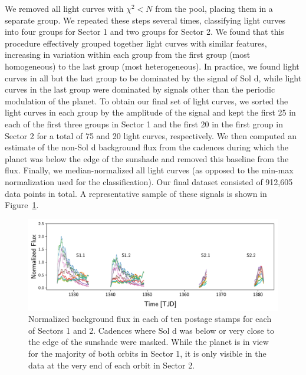 \documentclass[modern]{aastex62}
\begin{document}
We removed all light curves with $\chi^2 < N$ from the pool, placing
them in a separate group. We repeated these steps several times,
classifying light curves into four groups for Sector 1 and two groups for Sector 2. 
We found that this
procedure effectively grouped together light curves with similar features,
increasing in variation within each group from the first group (most homogeneous) 
to the last group (most heterogeneous). In practice, we found light curves
in all but the last group to be dominated by 
the signal of Sol d, while light
curves in the last group were dominated by signals other than the
periodic modulation of the planet. To obtain our final set of light curves, 
we sorted the light curves in each group by the amplitude
of the signal and kept the first 25 in each of the first three groups in Sector 1
and the first 20 in the first group in Sector 2 for a total
of 75 and 20 light curves, respectively. We then computed an estimate of the
non-Sol d background flux from the cadences during which the planet was below
the edge of the sunshade and removed this baseline from the flux.
Finally, we median-normalized all light curves (as opposed to the min-max
normalization used for the classification).
Our final dataset consisted of 912,605 data points in total. 
A representative sample of these signals is shown in Figure~\ref{fig:data}.

\begin{figure}[t!]
    \begin{centering}
    \includegraphics[width=\linewidth]{figures/data.pdf}
    \caption{\label{fig:data}
             Normalized background flux in each of ten postage stamps
             for each of Sectors 1 and 2. Cadences where Sol d was
             below or very close to the edge of the sunshade were masked.
             While the planet is in view for the majority of both orbits
             in Sector 1, it is only visible in the data at the very end
             of each orbit in Sector 2.
             }
    \end{centering}
\end{figure}
\end{document}
